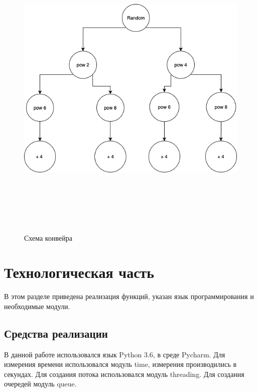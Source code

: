 \documentclass[12pt]{article}
\begin{document}
\begin{figure}[ht!]
	\centering
	\includegraphics[width=180mm, height=150mm]{Diagram.png}
	\caption{Схема конвейра\label{overflow}}
\end{figure}
\newpage


\newpage
\newpage

\section{Технологическая часть}

В этом разделе приведена реализация функций, указан язык программирования и необходимые модули. 
\subsection{Средства реализации}
В данной работе использовался язык Python 3.6, в среде Pycharm. Для измерения времени использовался модуль time, измерения производились в секундах. Для создания потока использовался модуль threading. Для создания очередей модуль queue. 
\end{document}
